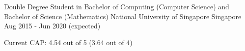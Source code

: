 

\begin{cventries}

  \cventry
  {Double Degree Student in Bachelor of Computing (Computer Science) and Bachelor of Science (Mathematics)} %
  {National University of Singapore} %
  {Singapore} %
  {Aug 2015 - Jun 2020 (expected)} %
  {
    \begin{cvitems} %
    \item {Current CAP: 4.54 out of 5 (3.64 out of 4)}
    \end{cvitems}
  }

\end{cventries}
